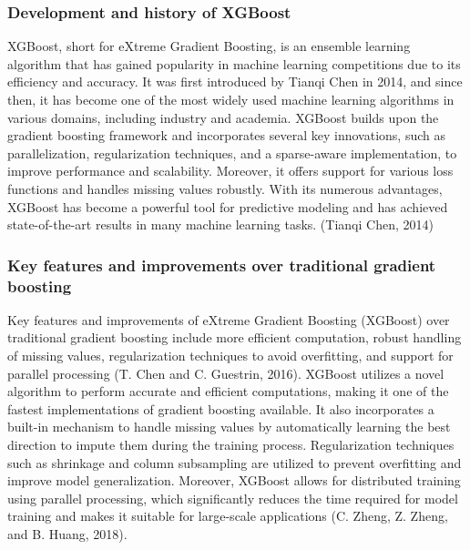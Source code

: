 \documentclass[12pt,oneside]{report}
\begin{document}
\subsubsection{Development and history of XGBoost}
XGBoost, short for eXtreme Gradient Boosting, is an ensemble learning algorithm that has gained popularity in machine learning competitions due to its efficiency and accuracy. It was first introduced by Tianqi Chen in 2014, and since then, it has become one of the most widely used machine learning algorithms in various domains, including industry and academia. XGBoost builds upon the gradient boosting framework and incorporates several key innovations, such as parallelization, regularization techniques, and a sparse-aware implementation, to improve performance and scalability. Moreover, it offers support for various loss functions and handles missing values robustly. With its numerous advantages, XGBoost has become a powerful tool for predictive modeling and has achieved state-of-the-art results in many machine learning tasks. (Tianqi Chen, 2014)

\subsubsection{Key features and improvements over traditional gradient boosting}
Key features and improvements of eXtreme Gradient Boosting (XGBoost) over traditional gradient boosting include more efficient computation, robust handling of missing values, regularization techniques to avoid overfitting, and support for parallel processing (T. Chen and C. Guestrin, 2016). XGBoost utilizes a novel algorithm to perform accurate and efficient computations, making it one of the fastest implementations of gradient boosting available. It also incorporates a built-in mechanism to handle missing values by automatically learning the best direction to impute them during the training process. Regularization techniques such as shrinkage and column subsampling are utilized to prevent overfitting and improve model generalization. Moreover, XGBoost allows for distributed training using parallel processing, which significantly reduces the time required for model training and makes it suitable for large-scale applications (C. Zheng, Z. Zheng, and B. Huang, 2018).
\end{document}
